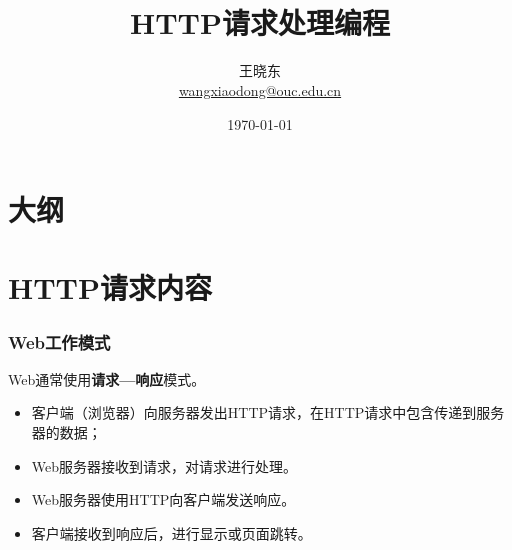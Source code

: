 
\title[KevinW@OUC]{\\  
HTTP请求处理编程}
\author[王晓东]{王晓东\\
  \href{mailto:wangxiaodong@ouc.edu.cn}{\footnotesize wangxiaodong@ouc.edu.cn}}
\date{\today}


 \frame{\titlepage}
\section*{大纲}

\section{HTTP请求内容}

\begin{frame}[fragile] %
  \frametitle{Web工作模式}

  Web通常使用{\bf\Red 请求—响应}模式。

  \begin{itemize}\kai
  \item 客户端（浏览器）向服务器发出HTTP请求，在HTTP请求中包含传递到服务器的数据；
  \item Web服务器接收到请求，对请求进行处理。
  \item Web服务器使用HTTP向客户端发送响应。
  \item 客户端接收到响应后，进行显示或页面跳转。
  \end{itemize}
\end{frame}

